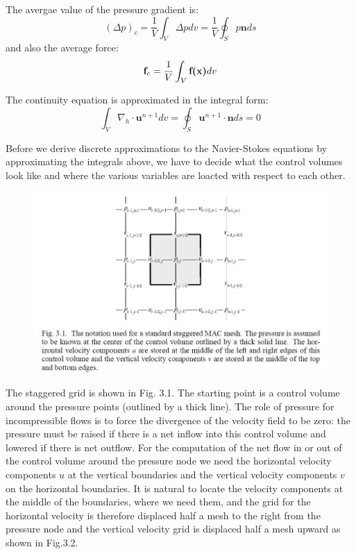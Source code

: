 \documentclass[11pt]{article} %
\begin{document}
The avergae value of the pressure gradient is:
\begin{equation}
(\Delta p)_c = \frac{1}{V} \int_{V} \Delta pdv = \frac{1}{V} \oint_{S} p\textbf{n}ds
\end{equation}and also the average force:
\begin{equation}
\textbf{f}_{c} = \frac{1}{V} \int_{V} \textbf{f(\textbf{x})}dv
\end{equation}\par
The continuity equation is approximated in the integral form:
\begin{equation}
\int_V
\nabla_{h}\cdot \textbf{u}^{n+1}dv =\oint_{S}\textbf{u}^{n+1}\cdot \textbf{n} ds= 0
\end{equation}\par 
Before we derive discrete approximations to the Navier-Stokes equations by approximating the integrals above, we have to decide what the control volumes look like and where the various variables are loacted with respect to each other. \par
\begin{figure}[h]
\includegraphics[scale=0.6]{staggered mesh 3.1.JPG}
\centering
\end{figure}
\par
The staggered grid is shown in Fig. 3.1. The starting point is a control volume around the pressure points (outlined by a thick line). The role of pressure for incompressible flows is to force the divergence of the velocity field to be zero: the pressure must be raised if there is a net inflow into this control volume and lowered if there is net outflow. For the computation of the net flow in or out of the control volume around the pressure node we need the horizontal velocity components $u$ at the vertical boundaries and the vertical velocity components $v$ on the horizontal boundaries. It is natural to locate the velocity components at the middle of the boundaries, where we need them, and the grid for the horizontal velocity is therefore displaced half a mesh to the right from the pressure node and the vertical velocity grid is displaced half a mesh upward as shown in Fig.3.2.
\end{document}
